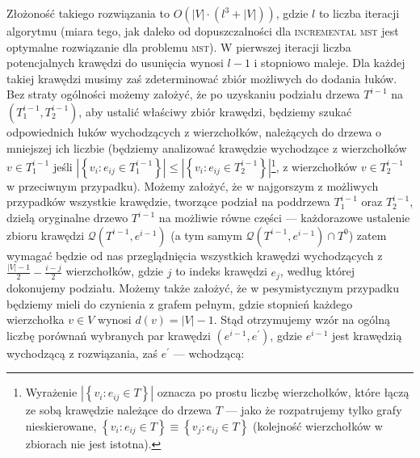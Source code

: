 Złożoność takiego rozwiązania to $O \left( \left| V \right| \cdot \left(l^{3} + \left| V \right| \right) \right)$, gdzie $l$ to liczba iteracji algorytmu (miara tego, jak daleko od dopuszczalności dla \textsc{incremental mst} jest optymalne rozwiązanie dla problemu \textsc{mst}). W pierwszej iteracji liczba potencjalnych krawędzi do usunięcia wynosi $l - 1$ i stopniowo maleje. Dla każdej takiej krawędzi musimy zaś zdeterminować zbiór możliwych do dodania łuków. Bez straty ogólności możemy założyć, że po uzyskaniu podziału drzewa $T^{i-1}$ na $\left( T^{i-1}_{1}, T^{i-1}_{2} \right)$, aby ustalić właściwy zbiór krawędzi, będziemy szukać odpowiednich łuków wychodzących z wierzchołków, należących do drzewa o mniejszej ich liczbie (będziemy analizować krawędzie wychodzące z wierzchołków $v \in T^{i-1}_{1}$ jeśli $\left| \left\{ v_{i} : e_{ij} \in T^{i-1}_{1} \right\} \right| \leqslant \left| \left\{ v_{i} : e_{ij} \in T^{i-1}_{2} \right\} \right|$\footnote{Wyrażenie $\left| \left\{ v_{i} : e_{ij} \in T \right\} \right|$ oznacza po prostu liczbę wierzchołków, które łączą ze sobą krawędzie należące do drzewa $T$ --- jako że rozpatrujemy tylko grafy nieskierowane, $\left\{ v_{i} : e_{ij} \in T \right\} \equiv \left\{ v_{j} : e_{ij} \in T \right\}$ (kolejność wierzchołków w zbiorach nie jest istotna).}, z wierzchołków $v \in T^{i-1}_{2}$ w przeciwnym przypadku). Możemy założyć, że w najgorszym z możliwych przypadków wszystkie krawędzie, tworzące podział na poddrzewa $T^{i-1}_{1}$ oraz $T^{i-1}_{2}$, dzielą oryginalne drzewo $T^{i-1}$ na możliwie równe części --- każdorazowe ustalenie zbioru krawędzi $\mathcal{Q} \left( T^{i-1}, e^{i-1} \right)$ (a tym samym $\mathcal{Q} \left( T^{i-1}, e^{i-1} \right) \cap T^{0}$) zatem wymagać będzie od nas przeglądnięcia wszystkich krawędzi wychodzących z $\frac{\left| V \right| - 1}{2} - \frac{i - j}{2}$ wierzchołków, gdzie $j$ to indeks krawędzi $e_{j}$, według której dokonujemy podziału. Możemy także założyć, że w pesymistycznym przypadku będziemy mieli do czynienia z grafem pełnym, gdzie stopnień każdego wierzchołka $v \in V$ wynosi $d \left( v \right) = \left| V \right| - 1$. Stąd otrzymujemy wzór na ogólną liczbę porównań wybranych par krawędzi $\left( e^{i-1}, e^{\prime} \right)$, gdzie $e^{i-1}$ jest krawędzią wychodzącą z rozwiązania, zaś $e^{\prime}$ --- wchodzącą:

